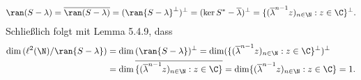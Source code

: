 \begin{solution}
\begin{enumerate}[label = (\alph*)]
\begin{align*}
    \ran(S - \lambda) = \overline{\ran(S - \lambda)} = (\ran{S - \lambda}^{\bot})^{\bot}
    = (\ker{S^* - \overline{\lambda}})^{\bot} = \{(\overline{\lambda}^{n-1} z)_{n \in \N}: z \in \C\}^{\bot}.
  \end{align*}
  Schließlich folgt mit Lemma 5.4.9, dass
  \begin{align*}
    \dim{(\ell^2(\N) / \ran{S - \lambda})} &= \dim{(\ran{S - \lambda})^{\bot}}
    = \dim(\{(\overline{\lambda}^{n-1} z)_{n \in \N}: z \in \C\}^{\bot})^{\bot} \\
    &= \dim\overline{\{(\overline{\lambda}^{n-1} z)_{n \in \N}: z \in \C\}}
    = \dim\{(\overline{\lambda}^{n-1} z)_{n \in \N}: z \in \C\} = 1.
  \end{align*}
\end{enumerate}
\end{solution}
